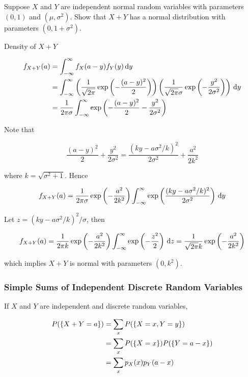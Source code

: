 \documentclass[a4paper,12pt]{article}
\begin{document}
\begin{exm}
  Suppose $X$ and $Y$ are independent normal random variables with parameters $(0,1)$ and $(\mu,\sigma^{2})$. Show that $X+Y$ has a normal distribution with parameters $(0,1+\sigma^{2})$.\n

  \ans Density of $X+Y$

  $$\begin{aligned}[t]
    f_{X+Y}(a)&=\int_{-\infty}^{\infty}f_{X}(a-y)f_{Y}(y)\,\mathrm{d} y\\
    &=\int_{-\infty}^{\infty}\left( \frac{1}{\sqrt{2\pi}}\exp\left( -\frac{(a-y)^{2}}{2}\right)\right)\left( \frac{1}{\sqrt{2\pi}\sigma}\exp\left( -\frac{y^{2}}{2\sigma^{2}}\right)\right)\,\mathrm{d} y\\
    &=\frac{1}{2\pi\sigma}\int_{-\infty}^{\infty}\exp\left( -\frac{(a-y)^{2}}{2}-\frac{y^{2}}{2\sigma^{2}}\right)
  \end{aligned}$$\s

  Note that

  $$\frac{(a-y)^{2}}{2}+\frac{y^{2}}{2\sigma^{2}}=\frac{(ky-a\sigma^{2}/k)^{2}}{2\sigma^{2}}+\frac{a^{2}}{2k^{2}}$$\s

  where $k=\sqrt{\sigma^{2}+1}$. Hence

  $$f_{X+Y}(a)=\frac{1}{2\pi\sigma}\exp\left( -\frac{a^{2}}{2k^{2}}\right)\int_{-\infty}^{\infty}\exp\left( \frac{(ky-a\sigma^{2}/k)^{2}}{2\sigma^{2}}\right)\,\mathrm{d} y$$\s

  Let $z=(ky-a\sigma^{2}/k)^{2}/\sigma$, then

  $$f_{X+Y}(a)=\frac{1}{2\pi k}\exp\left( -\frac{a^{2}}{2k^{2}}\right)\int_{-\infty}^{\infty}\exp\left( -\frac{z^{2}}{2}\right)\,\mathrm{d} z=\frac{1}{\sqrt{2\pi}k}\exp\left( -\frac{a^{2}}{2k^{2}}\right)$$\s

  which implies $X+Y$ is normal with parameters $(0,k^{2})$.
\end{exm}

\subsubsection{Simple Sums of Independent Discrete Random Variables}
If $X$ and $Y$ are independent and discrete random variables,

$$\begin{aligned}[t]
  P(\left\{ X+Y=a\right\})&=\sum_{x}P(\left\{ X=x,Y=y\right\})\\
  &=\sum_{x}P(\left\{ X=x\right\})P(\left\{ Y=a-x\right\})\\
  &=\sum_{x}p_{X}(x)p_{Y}(a-x)
\end{aligned}$$\s
\end{document}
